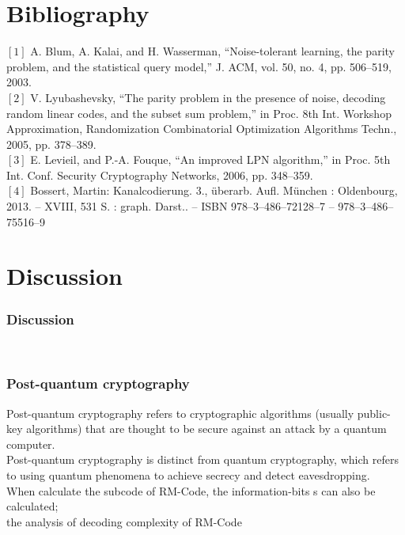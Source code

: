 \documentclass{beamer}
\begin{document}
\section{Bibliography}
\begin{outlineframe}
	\tableofcontents[currentsection]
\end{outlineframe}
\begin{bibliographyframe}
$[1]$ A. Blum, A. Kalai, and H. Wasserman, “Noise-tolerant learning, the parity problem, and the statistical query model,” J. ACM, vol. 50, no. 4, pp. 506–519, 2003.\\
$[2]$ V. Lyubashevsky, “The parity problem in the presence of noise, decoding random linear codes, and the subset sum problem,” in Proc. 8th Int. Workshop Approximation, Randomization Combinatorial
Optimization Algorithms Techn., 2005, pp. 378–389.\\
$[3]$ E. Levieil, and P.-A. Fouque, “An improved LPN algorithm,” in Proc. 5th Int. Conf. Security Cryptography Networks, 2006, pp. 348–359.\\
$[4]$ Bossert, Martin: Kanalcodierung. 3., überarb. Aufl. München : Oldenbourg, 2013. – XVIII, 531 S. : graph. Darst.. – ISBN 978–3–486–72128–7 – 978–3–486–75516–9 
\end{bibliographyframe}

\section{Discussion}
\begin{outlineframe}
	\tableofcontents[currentsection]
\end{outlineframe}
\begin{frame}
	\frametitle{Discussion}
	\\	
\end{frame}	

\begin{frame}
	\frametitle{Post-quantum cryptography}
	Post-quantum cryptography refers to cryptographic algorithms (usually public-key algorithms) that are thought to be secure against an attack by a quantum computer.\\
	Post-quantum cryptography is distinct from quantum cryptography, which refers to using quantum phenomena to achieve secrecy and detect eavesdropping.\\
	
	
	
	
	
	
	When calculate the subcode of RM-Code, the information-bits s can also be calculated;\\
	
	the analysis of decoding complexity of RM-Code\\
	
	
	
	
\end{frame}	



\begin{contactframe}
    \contactpage
\end{contactframe}
\end{document}
